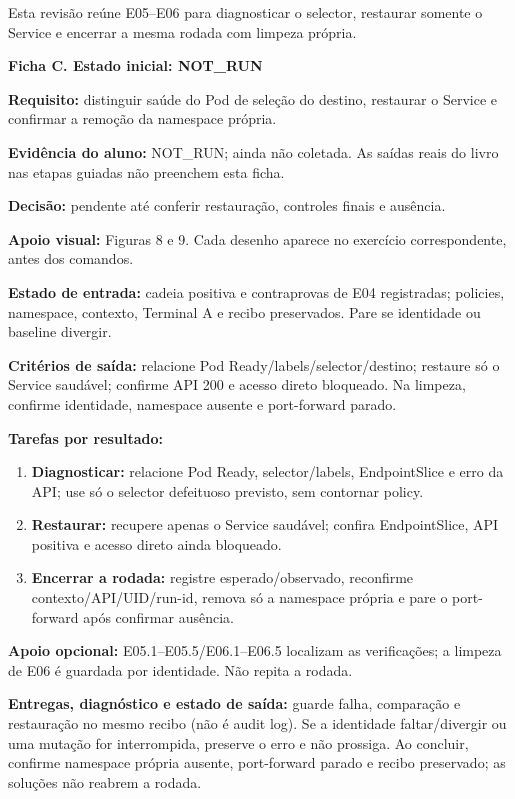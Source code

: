 \documentclass[12pt,openany,oneside,a4paper,chapter=TITLE,english,brazil]{abntex2}
\providecommand{\tightlist}{\setlength{\itemsep}{0pt}\setlength{\parskip}{0pt}}
\begin{document}
Esta revisão reúne E05--E06 para diagnosticar o selector, restaurar somente o Service e encerrar a mesma rodada com limpeza própria.

\begin{mdframed}[linewidth=0.6pt,innertopmargin=6pt,innerbottommargin=6pt]
\small
\textbf{Ficha C. Estado inicial: NOT\_RUN}

\textbf{Requisito:} distinguir saúde do Pod de seleção do destino,
restaurar o Service e confirmar a remoção da namespace própria.

\textbf{Evidência do aluno:} NOT\_RUN; ainda não coletada. As saídas
reais do livro nas etapas guiadas não preenchem esta ficha.

\textbf{Decisão:} pendente até conferir restauração, controles finais e
ausência.
\end{mdframed}

\textbf{Apoio visual:} Figuras 8 e 9. Cada desenho aparece no exercício correspondente, antes dos comandos.

\textbf{Estado de entrada:} cadeia positiva e contraprovas de E04 registradas; policies, namespace, contexto, Terminal A e recibo preservados. Pare se identidade ou baseline divergir.

\textbf{Critérios de saída:} relacione Pod Ready/labels/selector/destino; restaure só o Service saudável; confirme API 200 e acesso direto bloqueado. Na limpeza, confirme identidade, namespace ausente e port-forward parado.

\textbf{Tarefas por resultado:}

\begin{enumerate}
\def\labelenumi{\arabic{enumi}.}
\tightlist
\item
  \textbf{Diagnosticar:} relacione Pod Ready, selector/labels, EndpointSlice e erro da API; use só o selector defeituoso previsto, sem contornar policy.
\item
  \textbf{Restaurar:} recupere apenas o Service saudável; confira EndpointSlice, API positiva e acesso direto ainda bloqueado.
\item
  \textbf{Encerrar a rodada:} registre esperado/observado, reconfirme contexto/API/UID/run-id, remova só a namespace própria e pare o port-forward após confirmar ausência.
\end{enumerate}

\textbf{Apoio opcional:} E05.1--E05.5/E06.1--E06.5 localizam as verificações; a limpeza de E06 é guardada por identidade. Não repita a rodada.

\textbf{Entregas, diagnóstico e estado de saída:} guarde falha, comparação e restauração no mesmo recibo (não é audit log). Se a identidade faltar/divergir ou uma mutação for interrompida, preserve o erro e não prossiga. Ao concluir, confirme namespace própria ausente, port-forward parado e recibo preservado; as soluções não reabrem a rodada.
\end{document}
